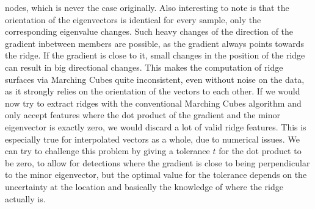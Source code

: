 nodes, which is never the case originally. Also interesting to note is
that the orientation of the eigenvectors is identical for every sample,
only the corresponding eigenvalue changes. Such heavy changes of the
direction of the gradient inbetween members are possible, as the
gradient always points towards the ridge. If the gradient is close to
it, small changes in the position of the ridge can result in big
directional changes. This makes the computation of ridge surfaces via
Marching Cubes quite inconsistent, even without noise on the data, as it
strongly relies on the orientation of the vectors to each other. If we
would now try to extract ridges with the conventional Marching Cubes
algorithm and only accept features where the dot product of the gradient
and the minor eigenvector is exactly zero, we would discard a lot of
valid ridge features. This is especially true for interpolated vectors
as a whole, due to numerical issues. We can try to challenge this
problem by giving a tolerance $t$ for the dot product to be zero, to
allow for detections where the gradient is close to being perpendicular
to the minor eigenvector, but the optimal value for the tolerance
depends on the uncertainty at the location and basically the knowledge
of where the ridge actually is.\\
